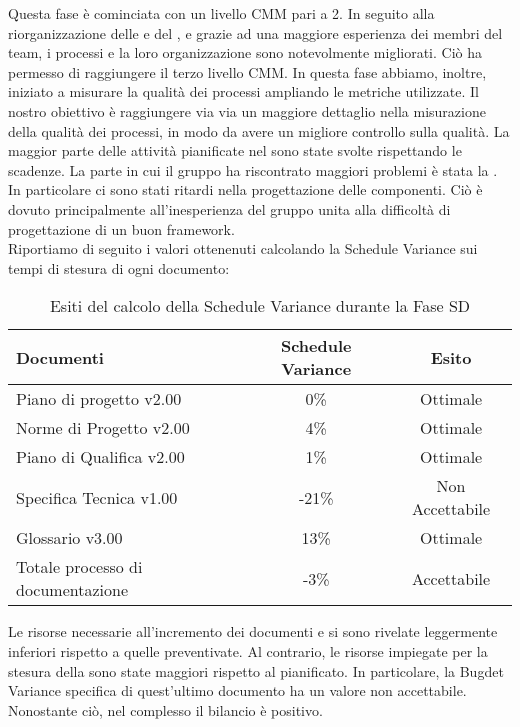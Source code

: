 			Questa fase è cominciata con un livello CMM pari a 2. In seguito alla riorganizzazione delle  e del , e grazie ad una maggiore esperienza dei membri del team, i processi e la loro organizzazione sono notevolmente migliorati. Ciò ha permesso di raggiungere il terzo livello CMM. In questa fase abbiamo, inoltre, iniziato a misurare la qualità dei processi ampliando le metriche utilizzate. Il nostro obiettivo è raggiungere via via un maggiore dettaglio nella misurazione della qualità dei processi, in modo da avere un migliore controllo sulla qualità.
			La maggior parte delle attività pianificate nel  sono state svolte rispettando le scadenze. La parte in cui il gruppo ha riscontrato maggiori problemi è stata la . In particolare ci sono stati ritardi nella progettazione delle componenti. Ciò è dovuto principalmente all'inesperienza del gruppo unita alla difficoltà di progettazione di un buon framework.\\
			Riportiamo di seguito i valori ottenenuti calcolando la Schedule Variance sui tempi di stesura di ogni documento:
			\begin{table}[H]
					\centering
					\begin{tabu}{| l | c | c |}
							\hline
							Documenti 							& Schedule Variance	& Esito		\\ \hline \hline
							
							Piano di progetto v2.00				& 0\% 		& Ottimale  \\ \hline
							Norme di Progetto v2.00 			& 4\%		& Ottimale  \\ \hline
							Piano di Qualifica v2.00 			& 1\%		& Ottimale  \\ \hline
							Specifica Tecnica v1.00 			& -21\%		& Non Accettabile  \\ \hline
							Glossario v3.00					 	& 13\% 		& Ottimale  \\ \hline
							Totale processo di documentazione & -3\% & Accettabile \\ \hline
						\end{tabu}
					\caption{Esiti del calcolo della Schedule Variance durante la Fase SD}
				\end{table}
			Le risorse necessarie all'incremento dei documenti  e  si sono rivelate leggermente inferiori rispetto a quelle preventivate. Al contrario, le risorse impiegate per la stesura della  sono state maggiori rispetto al pianificato. In particolare, la Bugdet Variance specifica di quest'ultimo documento ha un valore non accettabile. Nonostante ciò, nel complesso il bilancio è positivo.\\
